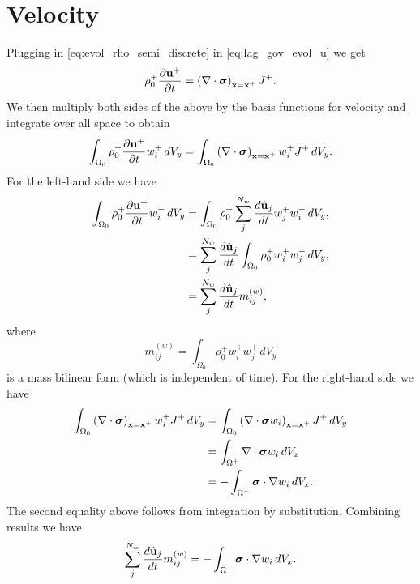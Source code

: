 \documentclass[11pt]{article}
\begin{document}
\section{Velocity}
Plugging in \cref{eq:evol_rho_semi_discrete} in \cref{eq:lag_gov_evol_u} we get
\begin{equation}
    \rho^+_0 \frac{\partial \mathbf{u}^+}{\partial t} = \left ( \nabla \cdot \bm \sigma \right )_{\mathbf{x} = \mathbf{x}^+} J^+.
\end{equation}
We then multiply both sides of the above by the basis functions for velocity and integrate over all space to obtain
\begin{equation}
    \int_{\Omega_0} \rho^+_0 \frac{\partial \mathbf{u}^+}{\partial t} w^+_i \, dV_y = \int_{\Omega_0} \left ( \nabla \cdot \bm \sigma \right )_{\mathbf{x} = \mathbf{x}^+} w^+_i J^+ \, dV_y.
\end{equation}
For the left-hand side we have
\begin{align}
    \int_{\Omega_0} \rho^+_0 \frac{\partial \mathbf{u}^+}{\partial t} w^+_i \, dV_y &= \int_{\Omega_0} \rho^+_0 \sum_j^{N_w} \frac{d \hat{\mathbf{u}}_j}{dt} w^+_j w^+_i \, dV_y, \nonumber \\
    &= \sum_j^{N_w} \frac{d \hat{\mathbf{u}}_j}{dt} \int_{\Omega_0} \rho^+_0 w^+_i w^+_j \, dV_y, \nonumber \\
    &= \sum_j^{N_w} \frac{d \hat{\mathbf{u}}_j}{dt} m_{ij}^{(w)},
\end{align}
where
\begin{equation}
    m_{ij}^{(w)} = \int_{\Omega_0} \rho^+_0 w^+_i w^+_j \, dV_y
\end{equation}
is a mass bilinear form (which is independent of time). For the right-hand side we have
\begin{align}
    \int_{\Omega_0} \left ( \nabla \cdot \bm \sigma \right )_{\mathbf{x} = \mathbf{x}^+} w^+_i J^+ \, dV_y & = \int_{\Omega_0} \left ( \nabla \cdot \bm \sigma w_i \right )_{\mathbf{x} = \mathbf{x}^+} J^+ \, dV_y \nonumber \\
    & = \int_{\Omega^+} \nabla \cdot \bm \sigma w_i \, dV_x \nonumber \\
    & = -\int_{\Omega^+} \bm \sigma \cdot \nabla w_i \, dV_x.
\end{align}
The second equality above follows from integration by substitution. Combining results we have
\begin{equation}
    \label{eq:evol_u_semi_discrete}
    \sum_j^{N_w} \frac{d \hat{\mathbf{u}}_j}{d t} m^{(w)}_{ij} = -\int_{\Omega^+} \bm \sigma \cdot \nabla w_i \, dV_x.
\end{equation}
\end{document}
